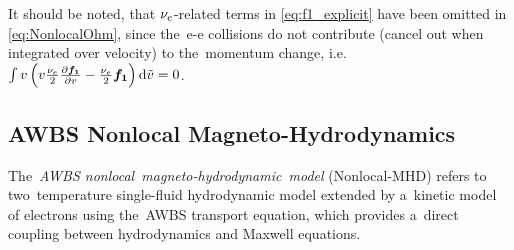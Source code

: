 It should be noted, that $\nu_{e}$-related terms in \eqref{eq:f1_explicit} 
have been omitted in \eqref{eq:NonlocalOhm}, 
since the~e-e collisions do not contribute 
(cancel out when integrated over velocity) to the~momentum
change, i.e. 
$\int v \left( v\frac{\nu_{e}}{2}\frac{\partial{{\boldsymbol{f_1}}}}{\partial{v}}
  - \frac{\nu_{e}}{2}{\boldsymbol{f_1}}\right) \text{d}\tilde{v} = 0$.

\begin{comment} %
\begin{eqnarray} 
  \E &=&  
  \frac{\nabla p_e - \vect{R}_{\Te}}{\qe \ed}
  +~~~~~~~~ 
  \frac{\vect{j}}{\sigma} 
  ~~~~~~-~~~~~~ 
  \frac{\vect{j}\vect{\times}\B}{\qe\ed c} 
  ,
  \nonumber \\
  \frac{\qe}{\me}\E 
  &=& 
  \frac{\int \vmag^2 \nabla \fzero~\dI \tilde{\vmag}}
  {\int \vmag \pdv{\fzero}{\vmag}~\dI \tilde{\vmag}}
  +  
  \frac{\int \vmag \nuei\fone~\dI \tilde{\vmag}}
  {\int \vmag \pdv{\fzero}{\vmag}~\dI \tilde{\vmag}} 
  + 
  \frac{\qe\int \vmag \fone\vect{\times}\B~\dI \tilde{\vmag}}
  {\me c \int \vmag \pdv{\fzero}{\vmag}~\dI \tilde{\vmag}} 
  .
  \nonumber
\end{eqnarray}
\end{comment} %

\subsection{AWBS Nonlocal Magneto-Hydrodynamics}
\label{sec:ANTH}
The~\textit{AWBS nonlocal~magneto-hydrodynamic~model} (Nonlocal-MHD)
refers to two~temperature single-fluid hydrodynamic model 
extended by a~kinetic model of electrons using the~AWBS transport equation,
which provides a~direct coupling between hydrodynamics and Maxwell equations.


